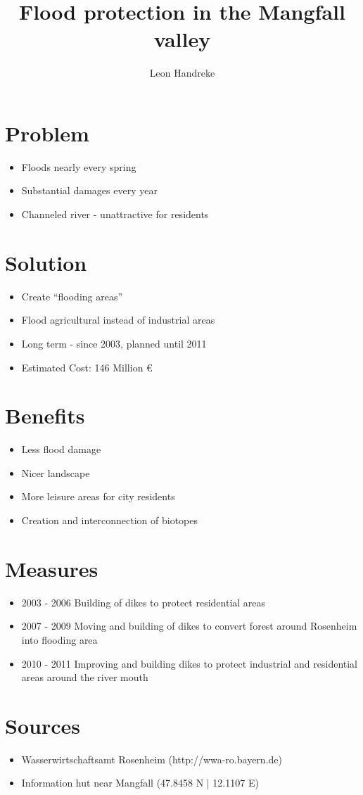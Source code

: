 \documentclass{article}
\title{Flood protection in the Mangfall valley}
\author{Leon Handreke}
\date{}                                           %
\begin{document}
\singlespacing

\maketitle
{}\selectfont

\section{Problem}
\begin{itemize}
	\item Floods nearly every spring
	\item Substantial damages every year
	\item Channeled river - unattractive for residents
\end{itemize}

\section{Solution}
\begin{itemize}
	\item Create “flooding areas”
	\item Flood agricultural instead of industrial areas
	\item Long term - since 2003, planned until 2011
	\item Estimated Cost: 146 Million \euro
\end{itemize}

\section{Benefits}
\begin{itemize}
	\item Less flood damage
	\item Nicer landscape
	\item More leisure areas for city residents
	\item Creation and interconnection of biotopes
\end{itemize}

\section{Measures}
\begin{itemize}
	\item 2003 - 2006 Building of dikes to protect residential areas
	\item 2007 - 2009 Moving and building of dikes to convert forest around Rosenheim into flooding area
	\item 2010 - 2011 Improving and building dikes to protect industrial and residential areas around the river mouth 
\end{itemize}

\section{Sources}
\begin{itemize}
	\item Wasserwirtschaftsamt Rosenheim (http://wwa-ro.bayern.de)
	\item Information hut near Mangfall (47.8458 N | 12.1107 E)
\end{itemize}
\end{document}
